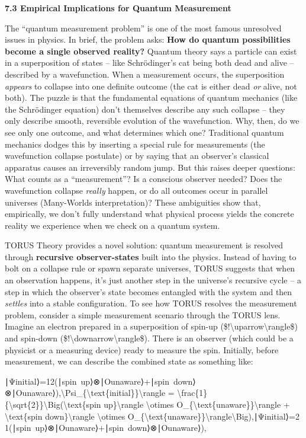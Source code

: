 \documentclass[]{article}
\begin{document}
\textbf{7.3 Empirical Implications for Quantum Measurement}

The ``quantum measurement problem'' is one of the most famous unresolved
issues in physics. In brief, the problem asks: \textbf{How do quantum
possibilities become a single observed reality?} Quantum theory says a
particle can exist in a superposition of states -- like Schrödinger's
cat being both dead and alive -- described by a wavefunction. When a
measurement occurs, the superposition \emph{appears} to collapse into
one definite outcome (the cat is either dead \emph{or} alive, not both).
The puzzle is that the fundamental equations of quantum mechanics (like
the Schrödinger equation) don't themselves describe any such collapse --
they only describe smooth, reversible evolution of the wavefunction.
Why, then, do we see only one outcome, and what determines which one?
Traditional quantum mechanics dodges this by inserting a special rule
for measurements (the wavefunction collapse postulate) or by saying that
an observer's classical apparatus causes an irreversibly random jump.
But this raises deeper questions: What counts as a ``measurement''? Is a
conscious observer needed? Does the wavefunction collapse \emph{really}
happen, or do all outcomes occur in parallel universes (Many-Worlds
interpretation)? These ambiguities show that, empirically, we don't
fully understand what physical process yields the concrete reality we
experience when we check on a quantum system.

TORUS Theory provides a novel solution: quantum measurement is resolved
through \textbf{recursive observer-states} built into the physics.
Instead of having to bolt on a collapse rule or spawn separate
universes, TORUS suggests that when an observation happens, it's just
another step in the universe's recursive cycle -- a step in which the
observer's state becomes entangled with the system and then
\emph{settles} into a stable configuration. To see how TORUS resolves
the measurement problem, consider a simple measurement scenario through
the TORUS lens. Imagine an electron prepared in a superposition of
spin-up (\$\textbar{}!\textbackslash{}uparrow\textbackslash{}rangle\$)
and spin-down
(\$\textbar{}!\textbackslash{}downarrow\textbackslash{}rangle\$). There
is an observer (which could be a physicist or a measuring device) ready
to measure the spin. Initially, before measurement, we can describe the
combined state as something like:

∣Ψinitial⟩=12(∣spin~up⟩⊗∣Ounaware⟩+∣spin~down⟩⊗∣Ounaware⟩),\textbar{}\textbackslash{}Psi\_\{\textbackslash{}text\{initial\}\}\textbackslash{}rangle
=
\textbackslash{}frac\{1\}\{\textbackslash{}sqrt\{2\}\}\textbackslash{}Big(\textbar{}\textbackslash{}text\{spin
up\}\textbackslash{}rangle \textbackslash{}otimes
\textbar{}O\_\{\textbackslash{}text\{unaware\}\}\textbackslash{}rangle +
\textbar{}\textbackslash{}text\{spin down\}\textbackslash{}rangle
\textbackslash{}otimes
\textbar{}O\_\{\textbackslash{}text\{unaware\}\}\textbackslash{}rangle\textbackslash{}Big),∣Ψinitial​⟩=2​1​(∣spin~up⟩⊗∣Ounaware​⟩+∣spin~down⟩⊗∣Ounaware​⟩),
\end{document}
